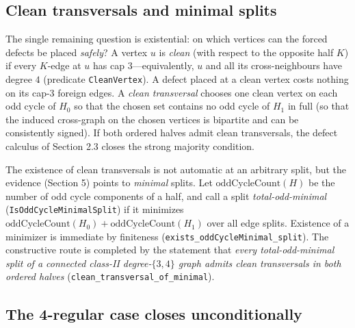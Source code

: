 \documentclass[11pt]{article}
\theoremstyle{definition}
\theoremstyle{remark}
\begin{document}
\subsection{Clean transversals and minimal splits}\label{24-clean-transversals}

The single remaining question is existential: on which vertices can the forced defects be placed \emph{safely}? A vertex $u$ is \emph{clean} (with respect to the opposite half $K$) if every $K$-edge at $u$ has cap $3$---equivalently, $u$ and all its cross-neighbours have degree $4$ (predicate \texttt{CleanVertex}). A defect placed at a clean vertex costs nothing on its cap-3 foreign edges. A \emph{clean transversal} chooses one clean vertex on each odd cycle of $H_0$ so that the chosen set contains no odd cycle of $H_1$ in full (so that the induced cross-graph on the chosen vertices is bipartite and can be consistently signed). If both ordered halves admit clean transversals, the defect calculus of Section 2.3 closes the strong majority condition.

The existence of clean transversals is not automatic at an arbitrary split, but the evidence (Section 5) points to \emph{minimal} splits. Let $\mathrm{oddCycleCount}(H)$ be the number of odd cycle components of a half, and call a split \emph{total-odd-minimal} (\texttt{IsOddCycleMinimalSplit}) if it minimizes $\mathrm{oddCycleCount}(H_0) + \mathrm{oddCycleCount}(H_1)$ over all edge splits. Existence of a minimizer is immediate by finiteness (\texttt{exists\_oddCycleMinimal\_split}). The constructive route is completed by the statement that \emph{every total-odd-minimal split of a connected class-II degree-$\{3,4\}$ graph admits clean transversals in both ordered halves} (\texttt{clean\_transversal\_of\_minimal}).

\subsection{The 4-regular case closes unconditionally}\label{25-fourreg}
\end{document}
